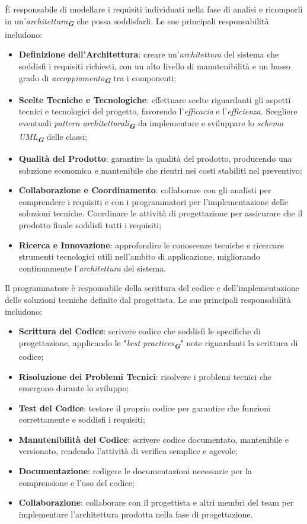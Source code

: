 È responsabile di modellare i requisiti individuati nella fase di analisi e ricomporli in un’\emph{architettura}\textsubscript{\textit{\textbf{G}}} che possa soddisfarli. 
Le sue principali responsabilità includono:
\begin{itemize}
    \item \textbf{Definizione dell'Architettura}: creare un'\emph{architettura} del sistema che soddisfi i requisiti richiesti, con un alto livello di manutenibilità e un basso grado di \emph{accoppiamento}\textsubscript{\textit{\textbf{G}}} tra i componenti;
    \item \textbf{Scelte Tecniche e Tecnologiche}: effettuare scelte riguardanti gli aspetti tecnici e tecnologici del progetto, favorendo l'\emph{efficacia} e l'\emph{efficienza}. Scegliere eventuali \emph{pattern architetturali}\textsubscript{\textit{\textbf{G}}} da implementare e sviluppare lo \emph{schema UML}\textsubscript{\textit{\textbf{G}}} delle classi;
    \item \textbf{Qualità del Prodotto}: garantire la qualità del prodotto, producendo una soluzione economica e mantenibile che rientri nei costi stabiliti nel preventivo;
    \item \textbf{Collaborazione e Coordinamento}: collaborare con gli analisti per comprendere i requisiti e con i programmatori per l'implementazione delle soluzioni tecniche. Coordinare le attività di progettazione per assicurare che il prodotto finale soddisfi tutti i requisiti;
    \item \textbf{Ricerca e Innovazione}: approfondire le conoscenze tecniche e ricercare strumenti tecnologici utili nell'ambito di applicazione, migliorando continuamente l'\emph{architettura} del sistema.
\end{itemize}

Il programmatore è responsabile della scrittura del codice e dell’implementazione delle soluzioni tecniche definite dal progettista. 
Le sue principali responsabilità includono:
\begin{itemize}
    \item \textbf{Scrittura del Codice}: scrivere codice che soddisfi le specifiche di progettazione, applicando le "\emph{best practices}\textsubscript{\textit{\textbf{G}}}" note riguardanti la scrittura di codice;
    \item \textbf{Risoluzione dei Problemi Tecnici}: risolvere i problemi tecnici che emergono durante lo sviluppo;
    \item \textbf{Test del Codice}: testare il proprio codice per garantire che funzioni correttamente e soddisfi i requisiti;
    \item \textbf{Manutenibilità del Codice}: scrivere codice documentato, mantenibile e versionato, rendendo l'attività di verifica semplice e agevole;
    \item \textbf{Documentazione}: redigere le documentazioni necessarie per la comprensione e l'uso del codice;
    \item \textbf{Collaborazione}: collaborare con il progettista e altri membri del team per implementare l'architettura prodotta nella fase di progettazione.
\end{itemize}

